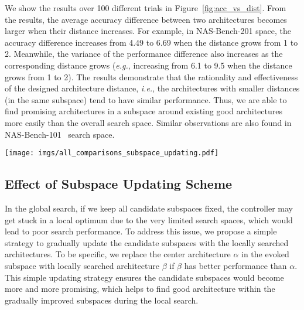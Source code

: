 \documentclass[lettersize,journal]{IEEEtran}
\def\eg{\emph{e.g.}} \def\Eg{\emph{E.g.}}
\def\ie{\emph{i.e.}} \def\Ie{\emph{I.e.}}
\begin{document}
We show the results over 100 different trials in Figure~\ref{fig:acc_vs_dist}.
From the results, the average accuracy difference between two architectures becomes larger when their distance increases.
For example, in NAS-Bench-201 space, the accuracy difference increases from 4.49 to 6.69 when the distance grows from 1 to 2.
Meanwhile, the variance of the performance difference also increases as the corresponding distance grows (\eg, increasing from 6.1 to 9.5 when the distance grows from 1 to 2).
The results demonstrate that the rationality and effectiveness of the designed architecture distance, \ie, the architectures with smaller distances (in the same subspace) tend to have similar performance.
Thus, we are able to find promising architectures in a subspace around existing good architectures more easily than the overall search space.
Similar observations are also found in NAS-Bench-101~\cite{ying2019bench} search space.


\begin{figure*}[!t]
\centering
{}
\hfil
{}
\caption{The performance difference that is measured by accuracy (\%) \vs~the architecture distance in NAS-Bench-201 search space (a) and MobileNet-like search space (b).}
\label{fig:acc_vs_dist}
\end{figure*}

\begin{figure*}[t]
\centering
\texttt{[image: imgs/all\_comparisons\_subspace\_updating.pdf]}
\caption{
Comparisons of the search performance with/without subspace updating on NAS-Bench-201.
}
\label{fig:all_comparisons_subspace_updating}
\end{figure*}


\subsection{Effect of Subspace Updating Scheme}
\label{sec:ablation_subspace_updating}

In the global search, if we keep all candidate subspaces fixed, the controller may get stuck in a local optimum due to the very limited search spaces, which would lead to poor search performance.
To address this issue, we propose a simple strategy to gradually update the candidate subspaces with the locally searched architectures.
To be specific, we replace the center architecture $\alpha$ in the evoked subspace with locally searched architecture $\beta$ if $\beta$ has better performance than $\alpha$.
This simple updating strategy ensures the candidate subspaces would become more and more promising, which helps to find good architecture within the gradually improved subspaces during the local search.
\end{document}
